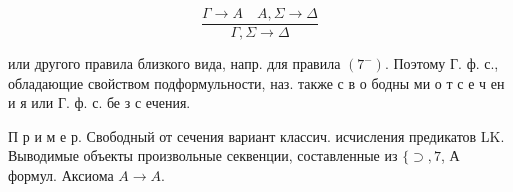 \documentclass[10pt]{article}
\begin{document}
\[

\frac{\Gamma \rightarrow A \quad A, \Sigma \rightarrow \Delta}{\Gamma, \Sigma \rightarrow \Delta}

\]



или другого правила близкого вида, напр. для правила $\left(7^{-}\right)$. Поэтому Г. ф. с., обладающие свойством подформульности, наз. также с в о бодны ми о т с е ч ен и я или $Г$. ф. с. бе з с ечения.



П р и м е р. Свободный от сечения вариант классич. исчисления предикатов LK. Выводимые объекты произвольные секвенции, составленные из $\{\supset, 7$, А формул. Аксиома $A \rightarrow A$.
\end{document}
